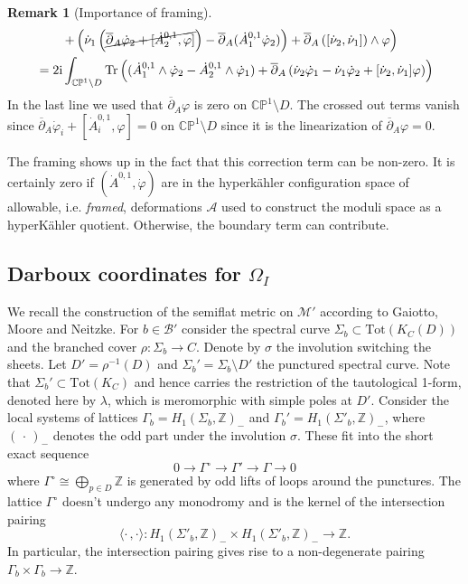 \documentclass[12pt,letterpaper,reqno]{amsart}
\theoremstyle{remark}
\theoremstyle{definition}
\newtheorem{rem}[thm]{Remark}
\numberwithin{thm}{section}
\numberwithin{equation}{section}
\numberwithin{figure}{section}
\newcommand{\cB}{\ensuremath{\mathcal B}}
\newcommand{\cM}{\ensuremath{\mathcal M}}
\newcommand{\CP}{\ensuremath{\mathbb {CP}}}
\newcommand{\Z}{\ensuremath{\mathbb Z}}
\newcommand{\delbar}{\ensuremath{\overline{\partial}}}
\newcommand{\I}{{\mathrm i}}
\DeclareMathOperator{\Tr}{Tr}
\begin{document}
\begin{rem}[Importance of framing]
\begin{align*}
   &  \qquad \left.+
 \left(\dot{\nu}_1 \left(\cancel{\delbar_A \dot{\varphi}_2 +  [\dot{A}^{0,1}_2, \varphi]} \right) - \delbar_A(\dot{A}^{0,1}_1 \dot{\varphi}_2)\right)
    + \delbar_A \left([\dot{\nu}_2, \dot{\nu}_1] \right) \wedge  \varphi  \right)\\
     &= 2\I \int_{\CP^1 \setminus D} \Tr \left( (\dot{A}^{0,1}_1 \wedge \dot{\varphi}_2 
   -\dot{A}^{0,1}_2 \wedge \dot{\varphi}_1)
   + \delbar_A\left(\dot{\nu}_2 \dot{\varphi}_1- \dot{\nu}_1 \dot{\varphi}_2+ [\dot{\nu}_2, \dot{\nu}_1]  \varphi \right) \right)
  \end{align*}
  In the last line we used that $\delbar_A \varphi$ is zero on $\CP^1 \setminus D$. The crossed out terms vanish since $\delbar_A \dot{\varphi}_i +[\dot{A}^{0,1}_i, \varphi]=0$ on $\CP^1 \setminus D$ since it is the linearization of $\delbar_A \varphi=0$. 
  
The framing shows up in the fact that this correction term can be non-zero. It is certainly zero if $(\dot{A}^{0,1}, \dot{\varphi})$ are in the hyperk\"ahler configuration space of allowable, i.e. \emph{framed}, deformations $\mathcal{A}$ used to construct the moduli space as a hyperK\"ahler quotient. Otherwise,  the boundary term can contribute.
\end{rem}

\subsection{Darboux coordinates for \texorpdfstring{$\Omega_I$}{the holomorphic symplectic form}}

 We recall the construction of the semiflat metric on $\cM'$ according to Gaiotto, Moore and Neitzke. For $b \in \cB'$ consider the spectral curve $\Sigma_b \subset \mathrm{Tot}(K_C(D))$ and the branched cover $\rho : \Sigma_b \to C$. Denote  by $\sigma$ the involution switching the sheets. Let $D' = \rho^{-1}(D)$ and $\Sigma_b' = \Sigma_b \setminus D'$ the punctured spectral curve. Note that $\Sigma_b' \subset \mathrm{Tot}(K_C)$ and hence carries the restriction of the tautological 1-form, denoted here by $\lambda$, which is meromorphic with simple poles at $D'$. Consider the local systems of lattices  $\Gamma_b = H_1(\Sigma_b, \Z)_-$ and $\Gamma_b' =H_1(\Sigma'_b , \Z)_-$, where $( \,\cdot\, )_-$ denotes the odd part under the involution $\sigma$. These fit into the short exact sequence
 \[
 0 \longrightarrow \Gamma^{\circ} \longrightarrow \Gamma' \longrightarrow \Gamma \longrightarrow 0 
 \]
 where $\Gamma^{\circ} \cong \bigoplus_{p \in D} \Z$ is generated by odd lifts of loops around the punctures. The lattice $\Gamma^{\circ}$ doesn't undergo any monodromy and is the kernel of the intersection pairing
 \[
 \langle \cdot \,  , \cdot \rangle : H_1(\Sigma'_b , \Z)_- \times H_1(\Sigma'_b , \Z)_- \to \Z.
 \]
 In particular, the intersection pairing gives rise to a non-degenerate pairing $\Gamma_b \times \Gamma_b \to \Z$.
 
\end{document}
